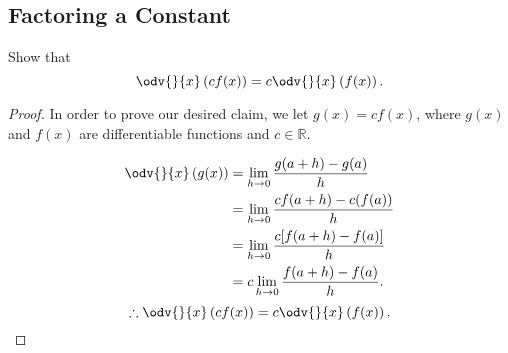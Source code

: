 \subsection{Factoring a Constant}

Show that
\[%
  \odv{}{x}\left(cf(x)\right) = c\odv{}{x}\left(f(x)\right)
.\]%

\begin{proof}
  In order to prove our desired claim, we let $g(x) = cf(x)$, where $g(x)$ and
  $f(x)$ are differentiable functions and $c \in \mathbb{R}$.

  \begin{align*}
    \odv{}{x}\left(g(x)\right) &= \lim_{h \to 0} \frac{g(a+h) - g(a)}{h} \\
                               &= \lim_{h \to 0} \frac{cf(a+h) - c(f(a))}{h} \\
                               &= \lim_{h \to 0} \frac{c[f(a+h) - f(a)]}{h} \\
                               &= c\lim_{h \to 0} \frac{f(a+h) - f(a)}{h}
  .\end{align*}
  \[%
    \therefore \odv{}{x}\left(cf(x)\right) = c\odv{}{x}\left(f(x)\right)
  .\]%
\end{proof}
